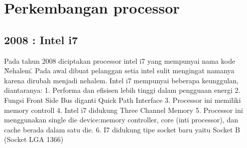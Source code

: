 \section{Perkembangan processor}
	\subsection{2008 : Intel i7}
	Pada tahun 2008 diciptakan processor intel i7 yang mempunyai nama kode \"Nehalem\". Pada awal dibuat pelanggan setia intel sulit mengingat namanya karena dirubah menjadi nehalem. Intel i7 mempunyai beberapa keunggulan, diantaranya:
	1. Performa dan efisisen lebih tinggi dalam pengguaan energi
	2. Fungsi Front Side Bus diganti Quick Path Interface
	3. Processor ini memiliki memory controll
	4. Intel i7 didukung Three Channel Memory
	5. Processor ini menggunakan single die device:memory controller, core (inti processor), dan cache berada dalam satu die.
	6. I7 didukung tipe socket baru yaitu Socket B (Socket LGA 1366)
